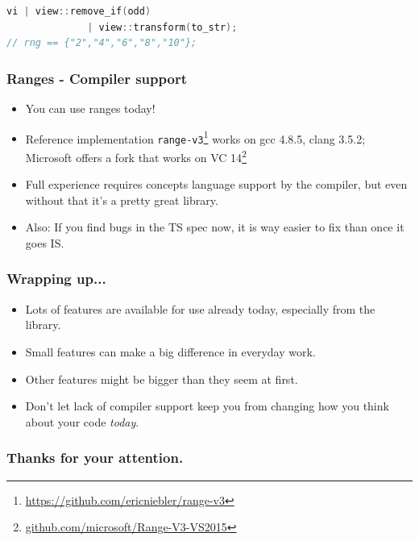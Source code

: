 \documentclass{beamer}
\begin{document}
\begin{frame}[fragile]
\begin{lstlisting}[language=C++,basicstyle=\ttfamily,keywordstyle=\color{blue},showstringspaces=false]
vi | view::remove_if(odd)
              | view::transform(to_str);
// rng == {"2","4","6","8","10"};
    \end{lstlisting}
\end{frame}

\begin{frame}
    \frametitle{Ranges - Compiler support}
    \begin{itemize}
        \item You can use ranges today!
        \item Reference implementation \texttt{range-v3}\footnote{\url{https://github.com/ericniebler/range-v3}} works on gcc 4.8.5, clang 3.5.2; Microsoft offers a fork that works on VC 14\footnote{\url{github.com/microsoft/Range-V3-VS2015}}
        \item Full experience requires concepts language support by the compiler, but even without that it's a pretty great library.
        \item Also: If you find bugs in the TS spec now, it is way easier to fix than once it goes IS.
    \end{itemize}
\end{frame}


\begin{frame}
    \frametitle{Wrapping up...}
    \begin{itemize}
        \item Lots of features are available for use already today, especially from the library.
        \item Small features can make a big difference in everyday work.
        \item Other features might be bigger than they seem at first.
        \item Don't let lack of compiler support keep you from changing how you think about your code \emph{today}.
    \end{itemize}
\end{frame}

\fi

\begin{frame}
  \frametitle{Thanks for your attention.}
\end{frame}
\end{document}
